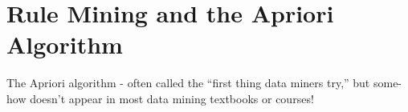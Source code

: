 \chapter{Rule Mining and the Apriori Algorithm}
The Apriori algorithm - often called the “first thing data miners try,” but some- how doesn’t appear in most data mining textbooks or courses!


